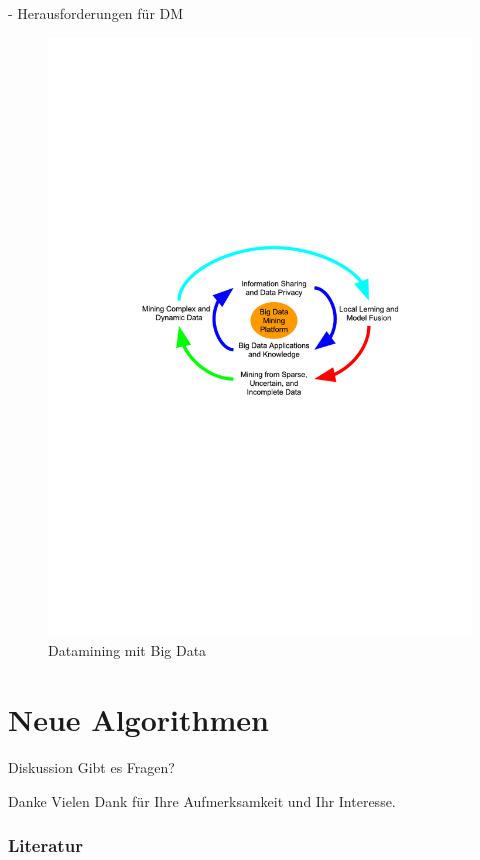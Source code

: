 \documentclass[fleqn,11pt,aspectratio=43]{beamer}
\begin{document}
\begin{frame}[fragile]{\insertsectionhead - Herausforderungen für DM \cite{wu2014data}}
\begin{figure}
\includegraphics[scale=0.7,trim={120 340 100 280},clip]{img/bigdata42.pdf}
\caption{Datamining mit Big Data \cite{wu2014data}}
\label{bigdata}
\end{figure}
\end{frame}

\section{Neue Algorithmen~}


\begin{frame}[highlight]{Diskussion}
\centering
Gibt es Fragen?
\end{frame}

\begin{frame}{Danke}
\centering
Vielen Dank für Ihre Aufmerksamkeit und Ihr Interesse.
\end{frame}

\begin{frame}[allowframebreaks]
\frametitle{Literatur}
%

\end{frame}
\end{document}
